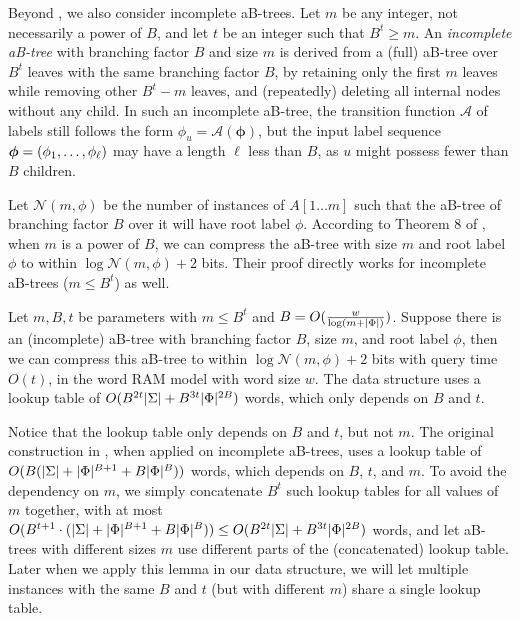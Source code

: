 \documentclass{article}
\theoremstyle{plain}
\theoremstyle{definition}  \newtheorem{definition}[theorem]{Definition}
\DeclarePairedDelimiter{\bk}{(}{)}
\DeclarePairedDelimiter{\abs}{\lvert}{\rvert}
\renewcommand{\l}{\ell}
\renewcommand{\vec}[1]{\bm{#1}}
\begin{document}
Beyond \cite{patrascu2008succincter}, we also consider incomplete aB-trees. Let $m$ be any integer, not necessarily a power of $B$, and let $t$ be an integer such that $B^t \ge m$. An \emph{incomplete aB-tree} with branching factor $B$ and size $m$ is derived from a (full) aB-tree over $B^t$ leaves with the same branching factor $B$, by retaining only the first $m$ leaves while removing other $B^t - m$ leaves, and (repeatedly) deleting all internal nodes without any child. In such an incomplete aB-tree, the transition function $\mathcal{A}$ of labels still follows the form $\phi_u = \mathcal{A}(\vec{\phi})$, but the input label sequence $\vec{\phi} = \bk{\phi_1, \ldots, \phi_{\l}}$ may have a length $\l$ less than $B$, as $u$ might possess fewer than $B$ children.

Let $\mathcal{N}(m, \phi)$ be the number of instances of $A[1\ldots m]$ such that the aB-tree of branching factor $B$ over it will have root label $\phi$. According to Theorem 8 of \cite{patrascu2008succincter}, when $m$ is a power of $B$, we can compress the aB-tree with size $m$ and root label $\phi$ to within $\log \mathcal{N}(m, \phi) + 2$ bits. Their proof directly works for incomplete aB-trees ($m \le B^t$) as well.

\begin{lemma}
  \label{lm:succincter}
  Let $m, B, t$ be parameters with $m \le B^t$ and $B = O\bk{\frac{w}{\log\bk{m + \abs{\Phi}}}}$. Suppose there is an (incomplete) aB-tree with branching factor $B$, size $m$, and root label $\phi$, then we can compress this aB-tree to within $\log \mathcal{N}(m, \phi) + 2$ bits with query time $O(t)$, in the word RAM model with word size $w$. The data structure uses a lookup table of $O\bk{B^{2t} \abs{\Sigma} + B^{3t} \abs{\Phi}^{2B}} $ words, which only depends on $B$ and $t$.
\end{lemma}

Notice that the lookup table only depends on $B$ and $t$, but not $m$. The original construction in \cite{patrascu2008succincter}, when applied on incomplete aB-trees, uses a lookup table of $O\bk{B(|\Sigma| + |\Phi|^{B+1} + B |\Phi|^B)}$ words, which depends on $B$, $t$, and $m$. To avoid the dependency on $m$, we simply concatenate $B^t$ such lookup tables for all values of $m$ together, with at most $O(B^{t+1}\cdot \bk{\abs{\Sigma} + \abs{\Phi}^{B+1} + B\abs{\Phi}^B}) \le O(B^{2t} \abs{\Sigma} + B^{3t}\abs{\Phi}^{2B})$ words, and let aB-trees with different sizes $m$ use different parts of the (concatenated) lookup table. Later when we apply this lemma in our data structure, we will let multiple instances with the same $B$ and $t$ (but with different $m$) share a single lookup table.
\end{document}
